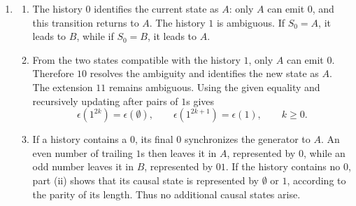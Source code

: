 \documentclass[11pt]{article}
\begin{document}
\begin{solution}[ex:p2-3]
\begin{enumerate}
\begin{enumerate}
          \item Appending each possible symbol gives the causal-state update:
            \[
              \begin{array}{c|cc}
                \text{state} & 0 & 1\\
                \hline
                \epsilon(\emptyset) & \epsilon(0)  & \epsilon(1)\\
                \epsilon(0)         & \epsilon(00) & \epsilon(01)\\
                \epsilon(1)         & \epsilon(10) & \epsilon(11)\\
                \epsilon(10)        & \epsilon(00) & \epsilon(01)\\
                \epsilon(00)        & \text{--}    & \epsilon(01)\\
                \epsilon(01)        & \epsilon(11) & \epsilon(11)\\
                \epsilon(11)        & \epsilon(00) & \text{--}
              \end{array}
            \]
            Here a dash denotes an impossible extension. Drawing one node for
            each row and the indicated symbol-labelled edges gives the
            required automaton.
        \end{enumerate}

      \item
        \begin{enumerate}
          \item The history $0$ identifies the current state as $A$: only $A$
            can emit $0$, and this transition returns to $A$. The history $1$
            is ambiguous. If $S_0=A$, it leads to $B$, while if $S_0=B$, it
            leads to $A$.

          \item From the two states compatible with the history $1$, only $A$
            can emit $0$. Therefore $10$ resolves the ambiguity and identifies
            the new state as $A$. The extension $11$ remains ambiguous. Using
            the given equality and recursively updating after pairs of $1$s
            gives
            \[
              \epsilon(1^{2k})=\epsilon(\emptyset),
              \qquad
              \epsilon(1^{2k+1})=\epsilon(1),
              \qquad k\geq0.
            \]

          \item If a history contains a $0$, its final $0$ synchronizes the
            generator to $A$. An even number of trailing $1$s then leaves it
            in $A$, represented by $0$, while an odd number leaves it in $B$,
            represented by $01$. If the history contains no $0$, part (ii)
            shows that its causal state is represented by $\emptyset$ or $1$,
            according to the parity of its length. Thus no additional causal
            states arise.


\end{enumerate}
\end{enumerate}
\end{solution}
\end{document}
